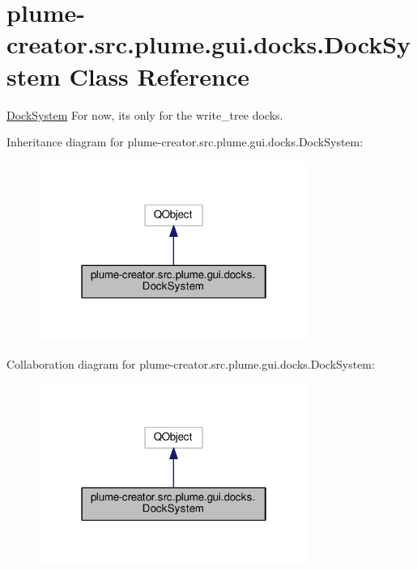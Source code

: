 \hypertarget{classplume-creator_1_1src_1_1plume_1_1gui_1_1docks_1_1_dock_system}{}\section{plume-\/creator.src.\+plume.\+gui.\+docks.\+Dock\+System Class Reference}
\label{classplume-creator_1_1src_1_1plume_1_1gui_1_1docks_1_1_dock_system}


\hyperlink{classplume-creator_1_1src_1_1plume_1_1gui_1_1docks_1_1_dock_system}{Dock\+System} For now, it\textquotesingle{}s only for the write\+\_\+tree docks.  




Inheritance diagram for plume-\/creator.src.\+plume.\+gui.\+docks.\+Dock\+System\+:\nopagebreak
\begin{figure}[H]
\begin{center}
\leavevmode
\includegraphics[width=250pt]{classplume-creator_1_1src_1_1plume_1_1gui_1_1docks_1_1_dock_system__inherit__graph}
\end{center}
\end{figure}


Collaboration diagram for plume-\/creator.src.\+plume.\+gui.\+docks.\+Dock\+System\+:\nopagebreak
\begin{figure}[H]
\begin{center}
\leavevmode
\includegraphics[width=250pt]{classplume-creator_1_1src_1_1plume_1_1gui_1_1docks_1_1_dock_system__coll__graph}
\end{center}
\end{figure}
